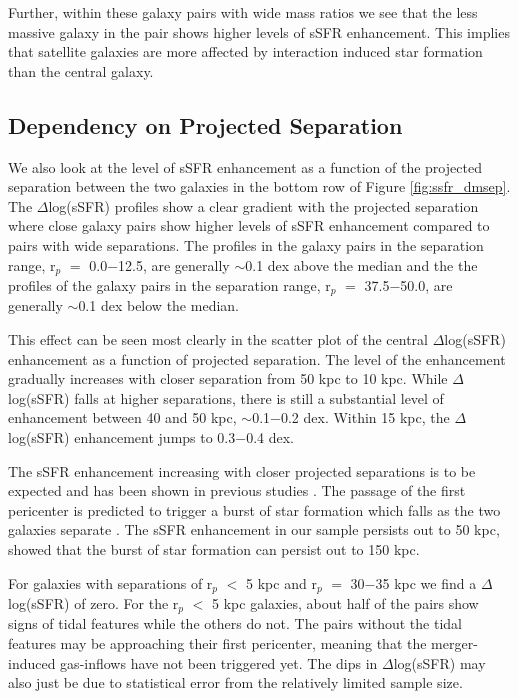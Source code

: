 \documentclass[iop,revtex4,twocolumn,apj,numberedappendix,appendixfloats]{emulateapj}
\begin{document}
Further, within these galaxy pairs with wide mass ratios we see that the less massive galaxy in the pair shows higher levels of sSFR enhancement. This implies that satellite galaxies are more affected by interaction induced star formation than the central galaxy. 

\subsection{Dependency on Projected Separation}\label{sec:sep}

We also look at the level of sSFR enhancement as a function of the projected separation between the two galaxies in the bottom row of Figure \ref{fig:ssfr_dmsep}. The $\Delta$log(sSFR) profiles show a clear gradient with the projected separation where close galaxy pairs show higher levels of sSFR enhancement compared to pairs with wide separations. The profiles in the galaxy pairs in the separation range, r$_p$ $=$ 0.0$-$12.5, are generally $\sim$0.1 dex above the median and the the profiles of the galaxy pairs in the separation range, r$_p$ $=$ 37.5$-$50.0, are generally $\sim$0.1 dex below the median. 

This effect can be seen most clearly in the scatter plot of the central $\Delta$log(sSFR) enhancement as a function of projected separation. The level of the enhancement gradually increases with closer separation from 50 kpc to 10 kpc. While $\Delta$log(sSFR) falls at higher separations, there is still a substantial level of enhancement between 40 and 50 kpc, $\sim$0.1$-$0.2 dex. Within 15 kpc, the $\Delta$log(sSFR) enhancement jumps to 0.3$-$0.4 dex. 

The sSFR enhancement increasing with closer projected separations is to be expected and has been shown in previous studies \citep{Li:2008, Ellison:2008, Scudder:2012, Patton:2013}. The passage of the first pericenter is predicted to trigger a burst of star formation which falls as the two galaxies separate \citep{Scudder:2012}. The sSFR enhancement in our sample persists out to 50 kpc, \citet{Patton:2013} showed that the burst of star formation can persist out to 150 kpc. 

For galaxies with separations of r$_p$ $<$ 5 kpc and r$_p$ $=$ 30$-$35 kpc we find a $\Delta$log(sSFR) of zero. For the r$_p$ $<$ 5 kpc galaxies, about half of the pairs show signs of tidal features while the others do not. The pairs without the tidal features may be approaching their first pericenter, meaning that the merger-induced gas-inflows have not been triggered yet. The dips in $\Delta$log(sSFR) may also just be due to statistical error from the relatively limited sample size.  
\end{document}
